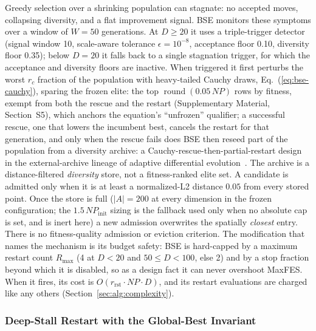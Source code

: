 Greedy selection over a shrinking population can stagnate: no
accepted moves, collapsing diversity, and a flat improvement signal.
BSE monitors these symptoms over a window of $W=50$ generations. At
$D\ge20$ it uses a triple-trigger detector (signal window 10,
scale-aware tolerance $\epsilon=10^{-8}$, acceptance floor 0.10,
diversity floor 0.35); below $D=20$ it falls back to a single
stagnation trigger, for which the acceptance and diversity floors are
inactive. When triggered it first perturbs the
worst $r_{c}$ fraction of the population with heavy-tailed
Cauchy draws, Eq.~(\ref{eq:bse-cauchy}), sparing the frozen elite:
the top $\operatorname{round}(0.05\,NP)$ rows by fitness, exempt from
both the rescue and the restart (Supplementary Material, Section~S5),
which anchors the equation's ``unfrozen'' qualifier; a successful rescue, one that
lowers the incumbent best, cancels the restart for that generation, and
only when the rescue fails does BSE then reseed part of the population from
a diversity archive: a Cauchy-rescue-then-partial-restart design in the
external-archive lineage of adaptive differential
evolution~\cite{storn1997differential,zhang2009jade,tanabe2013shade}. %
The archive is a distance-filtered \emph{diversity} store, not a
fitness-ranked elite set. A candidate is admitted only when it is at
least a normalized-L2 distance $0.05$ from every stored point. Once
the store is full ($|A| = 200$ at every dimension in the frozen configuration; the $1.5\,NP_{\text{init}}$ sizing is the fallback used only when no absolute cap is set, and is inert here)
a new admission overwrites the spatially \emph{closest} entry. There is no
fitness-quality admission or eviction criterion. %
The modification that names the mechanism is its budget safety: BSE is
hard-capped by a maximum restart count $R_{\max}$ (4 at $D{<}20$ and
$50{\le}D{<}100$, else 2) and by a stop fraction beyond which it is disabled, so as a
design fact it can never overshoot
MaxFES. %
When it fires, its cost is $O(r_{\text{rst}}\cdot NP\cdot D)$, and its
restart evaluations are charged like any others
(Section~\ref{sec:alg:complexity}). %

\subsubsection{Deep-Stall Restart with the Global-Best Invariant}\label{sec:alg:deepstall}

